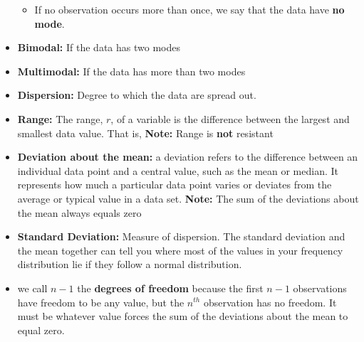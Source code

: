 \documentclass{report}
\begin{document}
\begin{itemize}
                \begin{itemize}
                    \item If no observation occurs more than once, we say that the data have \textbf{no mode}.
                \end{itemize}
            \item \textbf{Bimodal:} If the data has two modes
            \item \textbf{Multimodal:} If the data has more than two modes
            \item \textbf{Dispersion:} Degree to which the data are spread out. 
            \item \textbf{Range:} The range, $r $, of a variable is the difference between the largest and smallest data value. That is,
                \textbf{Note:} Range is \textbf{not} resistant
            \item \textbf{Deviation about the mean:} a deviation refers to the difference between an individual data point and a central value, such as the mean or median. It represents how much a particular data point varies or deviates from the average or typical value in a data set. 
                \bigbreak \noindent 
                \textbf{Note:} The sum of the deviations about the mean always equals zero
              \item \textbf{Standard Deviation:} Measure of dispersion. The standard deviation and the mean together can tell you where most of the values in your frequency distribution lie if they follow a normal distribution.
            \item  we call $n-1$ the \textbf{degrees of freedom} because the first $n-1 $  observations have freedom to be any value, but the $n^{th}$ observation has no freedom. It must be whatever value forces the sum of the deviations about the mean to equal zero.

\end{itemize}
\end{document}
